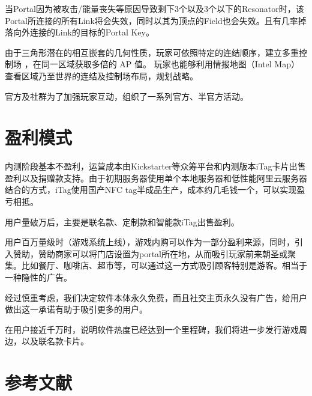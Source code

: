 \documentclass[UTF8]{ctexart}
\begin{document}
\begin{tcolorbox}[breakable]
    当Portal因为被攻击/能量丧失等原因导致剩下3个以及3个以下的Resonator时，该Portal所连接的所有Link将会失效，同时以其为顶点的Field也会失效。且有几率掉落向外连接的Link的目标的Portal Key。

    由于三角形潜在的相互嵌套的几何性质，玩家可依照特定的连结顺序，建立多重控制场 ，在同一区域获取多倍的 AP 值。 玩家也能够利用情报地图（Intel Map）查看区域乃至世界的连结及控制场布局，规划战略。\cite{wiki:Ingress}
\end{tcolorbox}


官方及社群为了加强玩家互动，组织了一系列官方、半官方活动。

\section{盈利模式}

内测阶段基本不盈利，运营成本由Kickstarter等众筹平台和内测版本iTag卡片出售盈利以及捐赠款支持。由于初期服务器使用单个本地服务器和低性能阿里云服务器结合的方式，iTag使用国产NFC tag半成品生产，成本约几毛钱一个，可以实现盈亏相抵。

用户量破万后，主要是联名款、定制款和智能款iTag出售盈利。

用户百万量级时（游戏系统上线），游戏内购可以作为一部分盈利来源，同时，引入赞助，赞助商家可以将门店设置为portal所在地，从而吸引玩家前来朝圣或聚集。比如餐厅、咖啡店、超市等，可以通过这一方式吸引顾客特别是游客。相当于一种隐性的广告。

经过慎重考虑，我们决定软件本体永久免费，而且社交主页永久没有广告，给用户做出这一承诺有助于吸引更多的用户。

在用户接近千万时，说明软件热度已经达到一个里程碑，我们将进一步发行游戏周边，以及联名款卡片。

\section{参考文献}



\end{document}
